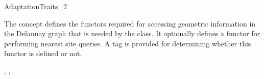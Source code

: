 

\begin{ccRefConcept}{AdaptationTraits_2}

\ccDefinition

The concept  defines the functors required for
accessing geometric information in the Delaunay graph that is needed by the
 class.
It optionally defines a functor for performing nearest site queries. A
tag is provided for determining whether this functor is defined or not.

\ccRefines
{}, , 


\end{ccRefConcept}
